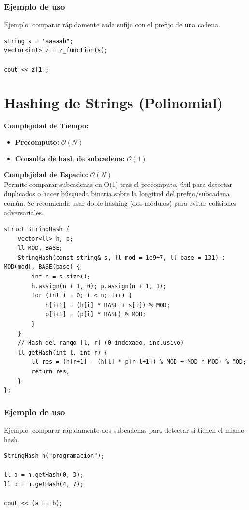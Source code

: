 \documentclass[10pt,twocolumn,letterpaper]{report}
\begin{document}
\subsubsection*{Ejemplo de uso}
Ejemplo: comparar rápidamente cada sufijo con el prefijo de una cadena.
\begin{lstlisting}
string s = "aaaaab";
vector<int> z = z_function(s);

cout << z[1];
\end{lstlisting}

\section{Hashing de Strings (Polinomial)}
\textbf{Complejidad de Tiempo:}
\begin{itemize}
    \item \textbf{Precomputo:} $\mathcal{O}(N)$
    \item \textbf{Consulta de hash de subcadena:} $\mathcal{O}(1)$
\end{itemize}
\textbf{Complejidad de Espacio:} $\mathcal{O}(N)$ \\
Permite comparar subcadenas en O(1) tras el precomputo, útil para detectar duplicados o hacer búsqueda binaria sobre la longitud del prefijo/subcadena común. Se recomienda usar doble hashing (dos módulos) para evitar colisiones adversariales.
\begin{lstlisting}
struct StringHash {
    vector<ll> h, p;
    ll MOD, BASE;
    StringHash(const string& s, ll mod = 1e9+7, ll base = 131) : MOD(mod), BASE(base) {
        int n = s.size();
        h.assign(n + 1, 0); p.assign(n + 1, 1);
        for (int i = 0; i < n; i++) {
            h[i+1] = (h[i] * BASE + s[i]) % MOD;
            p[i+1] = (p[i] * BASE) % MOD;
        }
    }
    // Hash del rango [l, r] (0-indexado, inclusivo)
    ll getHash(int l, int r) {
        ll res = (h[r+1] - (h[l] * p[r-l+1]) % MOD + MOD * MOD) % MOD;
        return res;
    }
};
\end{lstlisting}
\subsubsection*{Ejemplo de uso}
Ejemplo: comparar rápidamente dos subcadenas para detectar si tienen el mismo hash.
\begin{lstlisting}
StringHash h("programacion");

ll a = h.getHash(0, 3);
ll b = h.getHash(4, 7);

cout << (a == b);
\end{lstlisting}
\end{document}
